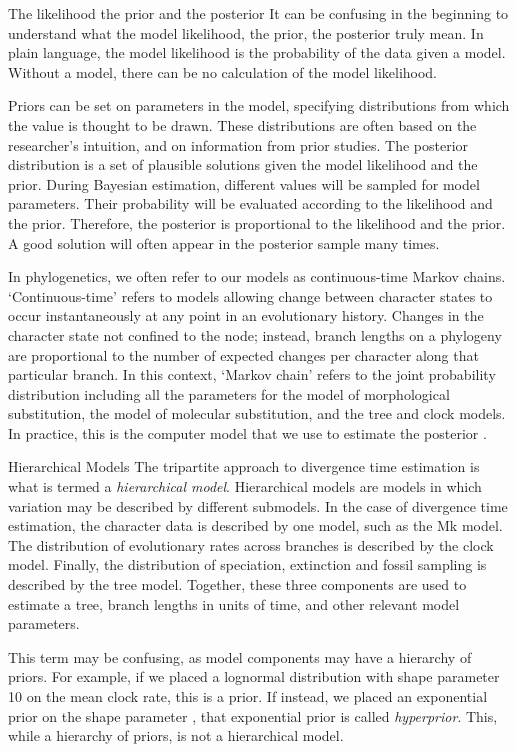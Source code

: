 \begin{boxedtext}{The likelihood the prior and the posterior} 
It can be confusing in the beginning to understand what the model likelihood, the prior,  the posterior truly mean.
In plain language, the model likelihood is the probability of the data given a model.
Without a model, there can be no calculation of the model  likelihood.

Priors can be set on parameters in the model, specifying distributions from which the value is thought to be drawn.
These distributions are often based on the researcher's intuition, and on information from prior studies.
The posterior distribution is a set of plausible solutions given the model likelihood and the prior.
During Bayesian estimation, different values will be sampled for model parameters.
Their probability will be evaluated according to the likelihood and the prior.
Therefore, the posterior is proportional to the likelihood and the prior.
A good solution will often appear in the posterior sample many times.

In phylogenetics, we often refer to our models as continuous-time Markov chains.
`Continuous-time' refers to models allowing change between character states to occur instantaneously at any point in an evolutionary history.
Changes in the character state  not confined to the node; instead, branch lengths on a phylogeny are proportional to the number of expected changes per character along that particular branch. 
In this context, `Markov chain' refers to the  joint probability distribution including all the parameters for the model of morphological substitution, the model of molecular substitution, and the tree and clock models. 
In practice, this is the computer model that we use to estimate the posterior \citep{Hoehna2016b}.
\end{boxedtext}

\begin{boxedtext}{Hierarchical Models}
The tripartite approach to divergence time estimation is what is termed a \textit{hierarchical model}. 
Hierarchical models are models in which variation may be described by different submodels.
In the case of divergence time estimation, the character data  is described by one model, such as the Mk model.
The distribution of evolutionary rates across branches is described by the clock model.
Finally, the distribution of speciation, extinction and fossil sampling is described by the tree model.
Together, these three components are used to estimate a tree, branch lengths in units of time, and other relevant model parameters.

This term may be confusing, as model components may have a hierarchy of priors. 
For example, if we placed a lognormal distribution with shape parameter 10 on the mean clock rate, this is a prior.
If instead, we placed an exponential prior on the shape parameter , that exponential prior is called \textit{hyperprior}.
This, while a hierarchy of priors, is not a hierarchical model. 
\end{boxedtext}

